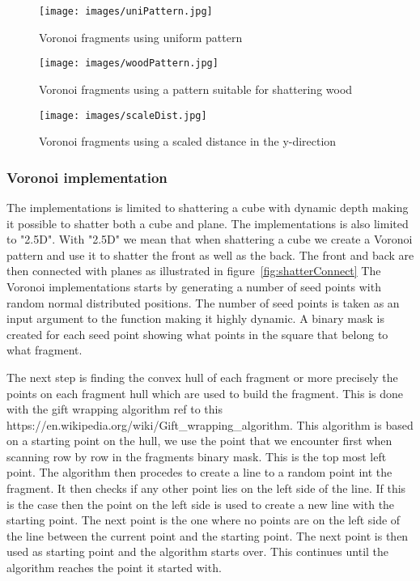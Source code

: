 \documentclass[10pt]{article}
\begin{document}
\begin{figure}
    \centering
    \texttt{[image: images/uniPattern.jpg]}
    \caption{Voronoi fragments using uniform pattern}
    \label{fig:uniPattern}
\end{figure}

\begin{figure}
    \centering
    \texttt{[image: images/woodPattern.jpg]}
    \caption{Voronoi fragments using a pattern suitable for shattering wood}
    \label{fig:woodPattern}
\end{figure}

\begin{figure}
    \centering
    \texttt{[image: images/scaleDist.jpg]}
    \caption{Voronoi fragments using a scaled distance in the y-direction}
    \label{fig:scaleDist}
\end{figure}


\subsubsection{Voronoi implementation}
The implementations is limited to shattering a cube with dynamic depth making
it possible to shatter both a cube and plane. The implementations is also
limited to "2.5D". With "2.5D" we mean that when shattering a cube we create a
Voronoi pattern and use it to shatter the front as well as the back. The front
and back are then connected with planes as illustrated in figure~\ref{fig:shatterConnect}
The Voronoi implementations starts by generating a number of seed points with
random normal distributed positions. The number of seed points is taken as an
input argument to the function making it highly dynamic. A binary mask is created
for each seed point showing what points in the square that belong to what fragment.

The next step is finding the convex hull of each fragment or more precisely
the points on each fragment hull which are used to build the fragment. This is
done with the gift wrapping algorithm ref to this https://en.wikipedia.org/wiki/Gift_wrapping_algorithm.
This algorithm is based on a starting point on the hull, we use the point
that we encounter first when scanning row by row in the fragments binary mask.
This is the top most left point. The algorithm then procedes to create a line
to a random point int the fragment. It then checks if any other point lies on
the left side of the line. If this is the case then the point on the left side
is used to create a new line with the starting point. The next point is the one
where no points are on the left side of the line between the current point and
the starting point. The next point is then used as starting point and the
algorithm starts over. This continues until the algorithm reaches the point
it started with.
\end{document}
